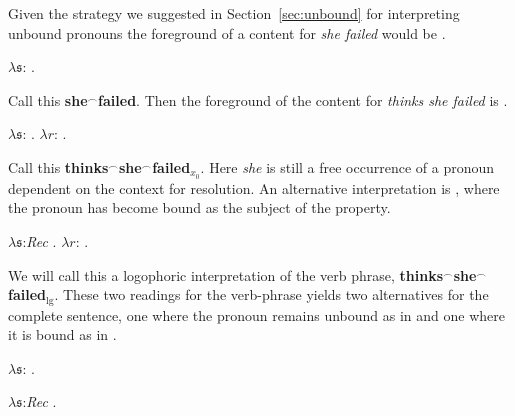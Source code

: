 Given the strategy we suggested in Section~\ref{sec:unbound} for
interpreting unbound pronouns  the foreground of a content for
\textit{she failed} would be \nexteg{}.
\begin{ex} 
$\lambda\mathfrak{s}$: .  
\end{ex} 
Call this \textbf{she$^\frown$failed}.  Then the foreground of the
content for \textit{thinks she failed} is \nexteg{}.
\begin{ex} 
$\lambda\mathfrak{s}$:
  . $\lambda r$:
    . 
\label{ex:thinks-she-failed-x0} 
\end{ex} 
Call this \textbf{thinks$^\frown$she$^\frown$failed$_{x_0}$}. Here
\textit{she} is still a free occurrence of a pronoun dependent on the
context for resolution.  An alternative interpretation is \nexteg{},
where the pronoun has become bound as the subject of the property.
\begin{ex} 
$\lambda\mathfrak{s}$:\textit{Rec} . $\lambda
r$:
.  
\end{ex} 
We will call this a logophoric interpretation of the verb phrase,
\textbf{thinks$^\frown$she$^\frown$failed$_{\mathrm{lg}}$}. These two
readings for the verb-phrase yields two alternatives for the complete
sentence, one where the pronoun remains unbound as in  and
one where it is bound as in .
\begin{ex} 
\begin{subex} 
 
\item
  $\lambda\mathfrak{s}$:
    .  
 
\item $\lambda\mathfrak{s}$:\textit{Rec}
  .  
 
\end{subex} 
   
\end{ex} 

